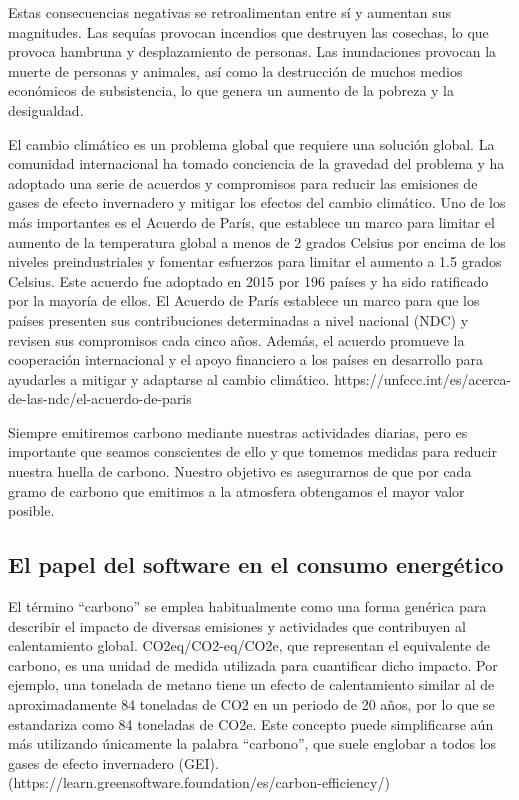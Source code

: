 \documentclass[12pt,a4paper]{report}
\begin{document}
Estas consecuencias negativas se retroalimentan entre sí y aumentan sus magnitudes. Las sequías provocan incendios que destruyen las cosechas, lo que provoca hambruna y desplazamiento de personas. 
Las inundaciones provocan la muerte de personas y animales, así como la destrucción de muchos medios económicos de subsistencia, lo que genera un aumento de la pobreza y la desigualdad.

El cambio climático es un problema global que requiere una solución global. La comunidad internacional ha tomado conciencia de la gravedad del problema y ha adoptado una serie de acuerdos y compromisos para 
reducir las emisiones de gases de efecto invernadero y mitigar los efectos del cambio climático. Uno de los más importantes es el Acuerdo de París, que establece un marco para limitar el aumento de la temperatura 
global a menos de 2 grados Celsius por encima de los niveles preindustriales y fomentar esfuerzos para limitar el aumento a 1.5 grados Celsius. Este acuerdo fue adoptado en 2015 por 196 países y ha sido ratificado 
por la mayoría de ellos. El Acuerdo de París establece un marco para que los países presenten sus contribuciones determinadas a nivel nacional (NDC) y revisen sus compromisos cada cinco años. Además, el acuerdo 
promueve la cooperación internacional y el apoyo financiero a los países en desarrollo para ayudarles a mitigar y adaptarse al cambio climático. {https://unfccc.int/es/acerca-de-las-ndc/el-acuerdo-de-paris}

Siempre emitiremos carbono mediante nuestras actividades diarias, pero es importante que seamos conscientes de ello y que tomemos medidas para reducir nuestra huella de carbono. Nuestro objetivo es asegurarnos
de que por cada gramo de carbono que emitimos a la atmosfera obtengamos el mayor valor posible.

\subsection{El papel del software en el consumo energético}

El término ``carbono'' se emplea habitualmente como una forma genérica para describir el impacto de diversas emisiones y actividades que contribuyen al calentamiento global. CO2eq/CO2-eq/CO2e, que representan el 
equivalente de carbono, es una unidad de medida utilizada para cuantificar dicho impacto. Por ejemplo, una tonelada de metano tiene un efecto de calentamiento similar al de aproximadamente 84 toneladas de CO2 en 
un periodo de 20 años, por lo que se estandariza como 84 toneladas de CO2e. Este concepto puede simplificarse aún más utilizando únicamente la palabra “carbono”, que suele englobar a todos los gases de efecto 
invernadero (GEI). (https://learn.greensoftware.foundation/es/carbon-efficiency/)
\end{document}
